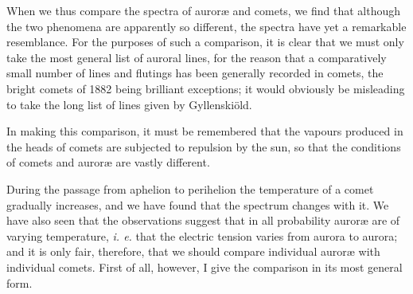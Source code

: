 \documentclass[a4paper, 12pt, oneside, polutonikogreek, english]{article}
\begin{document}
When we thus compare the spectra of auroræ and comets, we find that although the two phenomena are apparently so different, the spectra have yet a remarkable resemblance. For the purposes of such a comparison, it is clear that we must only take the most general list of auroral lines, for the reason that a comparatively small number of lines and flutings has been generally recorded in comets, the bright comets of 1882 being brilliant exceptions; it would obviously be misleading to take the long list of lines given by Gyllenskiöld.

In making this comparison, it must be remembered that the vapours produced in the heads of comets are subjected to repulsion by the sun, so that the conditions of comets and auroræ are vastly different.

During the passage from aphelion to perihelion the temperature of a comet gradually increases, and we have found that the spectrum changes with it. We have also seen that the observations suggest that in all probability auroræ are of varying temperature, \emph{i. e.} that the electric tension varies from aurora to aurora; and it is only fair, therefore, that we should compare individual auroræ with individual comets. First of all, however, I give the comparison in its most general form.
\end{document}

